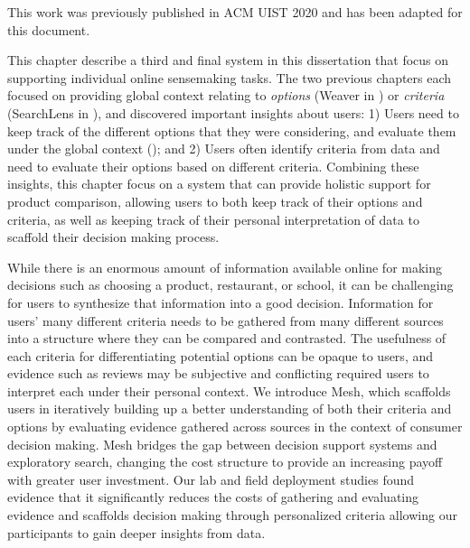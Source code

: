 

\newcommand{\SYSTEM}{Mesh\xspace}

{\rmfamily
This work was previously published in ACM UIST 2020 and has been adapted for this document.
}

This chapter describe a third and final system in this dissertation that focus on supporting individual online sensemaking tasks. The two previous chapters each focused on providing global context relating to \emph{options} (Weaver in ) or \emph{criteria} (SearchLens in ), and discovered important insights about users: 1) Users need to keep track of the different options that they were considering, and evaluate them under the global context (); and 2) Users often identify criteria from data and need to evaluate their options based on different criteria. Combining these insights, this chapter focus on a system that can provide holistic support for product comparison, allowing users to both keep track of their options and criteria, as well as keeping track of their personal interpretation of data to scaffold their decision making process.

While there is an enormous amount of information available online for making decisions such as choosing a product, restaurant, or school, it can be challenging for users to synthesize that information into a good decision. Information for users' many different criteria needs to be gathered from many different sources into a structure where they can be compared and contrasted. The usefulness of each criteria for differentiating potential options can be opaque to users, and evidence such as reviews may be subjective and conflicting required users to interpret each under their personal context. We introduce \SYSTEM, which scaffolds users in iteratively building up a better understanding of both their criteria and options by evaluating evidence gathered across sources in the context of consumer decision making. \SYSTEM bridges the gap between decision support systems and exploratory search, changing the cost structure to provide an increasing payoff with greater user investment. Our lab and field deployment studies found evidence that it significantly reduces the costs of gathering and evaluating evidence and scaffolds decision making through personalized criteria allowing our participants to gain deeper insights from data.





